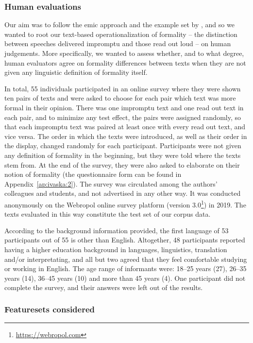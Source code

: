 \documentclass[output=paper]{langscibook}
\begin{document}
\subsubsection{Human evaluations}\label{sec:ivaska:3.2.2}


Our aim was to follow the emic approach and the example set by \citet{LiEtAl2016}, and so we wanted to root our text-based operationalization of formality – the distinction between speeches delivered impromptu and those read out loud – on human judgements. More specifically, we wanted to assess whether, and to what degree, human evaluators agree on formality differences between texts when they are not given any linguistic definition of formality itself.

In total, 55 individuals participated in an online survey where they were shown ten pairs of texts and were asked to choose for each pair which text was more formal in their opinion. There was one impromptu text and one read out text in each pair, and to minimize any test effect, the pairs were assigned randomly, so that each impromptu text was paired at least once with every read out text, and vice versa. The order in which the texts were introduced, as well as their order in the display, changed randomly for each participant. Participants were not given any definition of formality in the beginning, but they were told where the texts stem from. At the end of the survey, they were also asked to elaborate on their notion of formality (the questionnaire form can be found in Appendix~\ref{ap:ivaska:2}). The survey was circulated among the authors’ colleagues and students, and not advertised in any other way. It was conducted anonymously on the Webropol online survey platform (version 3.0\footnote{\url{https://webropol.com}}) in 2019. The texts evaluated in this way constitute the test set of our corpus data. 

According to the background information provided, the first language of 53 participants out of 55 is other than English. Altogether, 48 participants reported having a higher education background in languages, linguistics, translation and\slash or interpretating, and all but two agreed that they feel comfortable studying or working in English. The age range of informants were: 18--25 years (27), 26--35 years (14), 36--45 years (10) and more than 45 years (4). One participant did not complete the survey, and their answers were left out of the results.

\subsubsection{Featuresets considered}\label{sec:ivaska:3.2.3}
\end{document}

